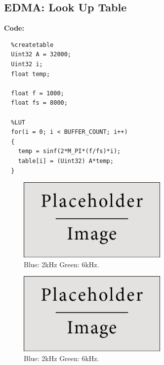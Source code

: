 \documentclass{article}
\begin{document}
\subsection{EDMA: Look Up Table}

\textbf{Code:}

\begin{verbatim}
  %createtable
  Uint32 A = 32000;
  Uint32 i;
  float temp;

  float f = 1000;
  float fs = 8000;

  %LUT
  for(i = 0; i < BUFFER_COUNT; i++)
  {
    temp = sinf(2*M_PI*(f/fs)*i);
    table[i] = (Uint32) A*temp;
  }
\end{verbatim}

\begin{figure}[h]
  \begin{center}
    \includegraphics[width=0.65\textwidth]{img/placeholder.jpg}
    \caption{Blue: 2kHz Green: 6kHz.}
  \end{center}
\end{figure}

\begin{figure}[h]
  \begin{center}
    \includegraphics[width=0.65\textwidth]{img/placeholder.jpg}
    \caption{Blue: 2kHz Green: 6kHz.}
  \end{center}
\end{figure}

\end{document}
